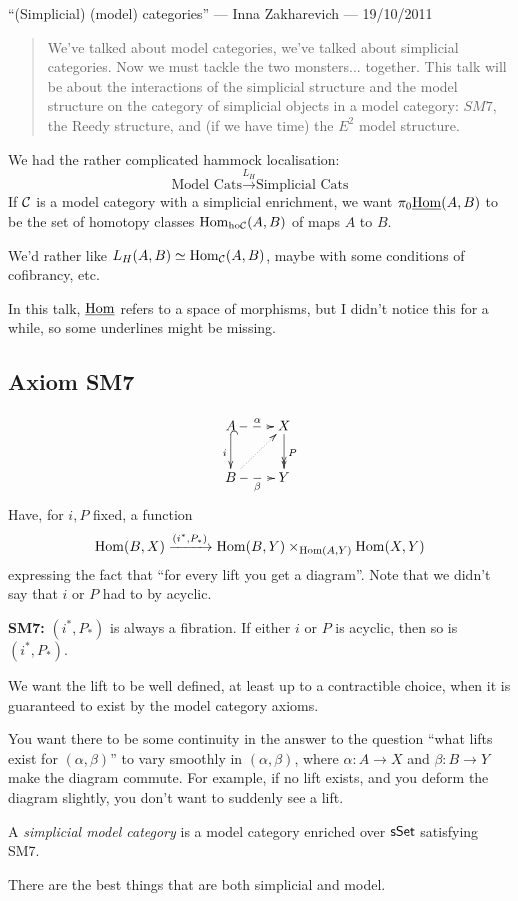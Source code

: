 \begin{InnaSimplicalModelCats}
\KanSemResponse
{``(Simplicial) (model) categories'' --- Inna Zakharevich --- 19/10/2011}
\begin{abstract}
We've talked about model categories, we've talked about simplicial categories. Now we must tackle the two monsters... together. This talk will be about the interactions of the simplicial structure and the model structure on the category of simplicial objects in a model category: $SM7$, the Reedy structure, and (if we have time) the $E^2$ model structure.
\end{abstract}
We had the rather complicated hammock localisation:
\[\text{Model Cats}\overset{L_H}{\to}\text{Simplicial Cats}\]
If $\mathcal{C}$ is a model category with a simplicial enrichment, we want $\pi_0\underline{\operatorname{Hom}}(A,B)$ to be the set of homotopy classes $\operatorname{Hom}_{\textup{ho}\mathcal{C}}(A,B)$ of maps $A$ to $B$.

We'd rather like $L_H(A,B)\simeq \operatorname{Hom}_{\mathcal{C}}(A,B)$, maybe with some conditions of cofibrancy, etc.

In this talk, $\underline{\operatorname{Hom}}$ refers to a space of morphisms, but I didn't notice this for a while, so some underlines might be missing.
\subsection*{Axiom SM7}
\[\xymatrix{
A\ar@{-->}[r]^\alpha\ar@{^{(}->}[d]_i&X\ar@{->>}[d]^P\\
B\ar@{-->}[r]_\beta\ar@{..>}[ur]&Y
}\]
Have, for $i,P$ fixed, a function 
 \[\operatorname{Hom}(B,X)\xrightarrow{(i^*,P_*)}\operatorname{Hom}(B,Y)\times_{\operatorname{Hom}(A,Y)}\operatorname{Hom}(X,Y)\]
expressing the fact that ``for every lift you get a diagram''. Note that
we didn't say that $i$ or $P$ had to by acyclic.

\noindent \textbf{\Bullet SM7:} $(i^*,P_*)$ is always a fibration. If either $i$ or $P$ is acyclic, then so is $(i^*,P_*)$.
\begin{itemise}
\item We want the lift to be well defined, at least up to a contractible choice, when it is guaranteed to exist by the model category axioms.
\item You want there to be some continuity in the answer to the question ``what lifts exist for $(\alpha,\beta)$'' to vary smoothly in $(\alpha,\beta)$, where $\alpha:A\to X$ and $\beta:B\to Y$ make the diagram commute. For example, if no lift exists, and you deform the diagram slightly, you don't want to suddenly see a lift.
\end{itemise}
\begin{defn*}
A \emph{simplicial model category} is a model category enriched over $\operatorname{{\mathsf{sSet}}}$ satisfying SM7.
\end{defn*}
\noindent There are the best things that are both simplicial and model.

\end{InnaSimplicalModelCats}
